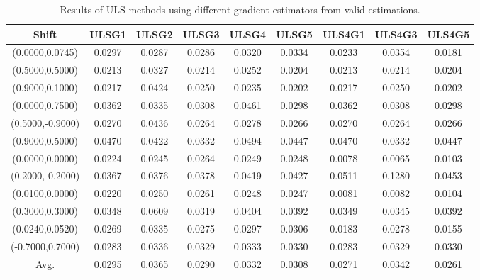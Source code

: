 \begin{table}[ht!]
\centering
\begin{tabular}{c|c|c|c|c|c|c|c|c}
Shift & \scriptsize{ULSG1} & \scriptsize{ULSG2} & \scriptsize{ULSG3} & \scriptsize{ULSG4} & \scriptsize{ULSG5} & \scriptsize{ULS4G1} & \scriptsize{ULS4G3} & \scriptsize{ULS4G5}\\ \hline 
(0.0000,0.0745) & 0.0297 & 0.0287 & 0.0286 & 0.0320 & 0.0334 & 0.0233 & 0.0354 & 0.0181 \\ \hline
(0.5000,0.5000) & 0.0213 & 0.0327 & 0.0214 & 0.0252 & 0.0204 & 0.0213 & 0.0214 & 0.0204 \\ \hline
(0.9000,0.1000) & 0.0217 & 0.0424 & 0.0250 & 0.0235 & 0.0202 & 0.0217 & 0.0250 & 0.0202 \\ \hline
(0.0000,0.7500) & 0.0362 & 0.0335 & 0.0308 & 0.0461 & 0.0298 & 0.0362 & 0.0308 & 0.0298 \\ \hline
(0.5000,-0.9000) & 0.0270 & 0.0436 & 0.0264 & 0.0278 & 0.0266 & 0.0270 & 0.0264 & 0.0266 \\ \hline
(0.9000,0.5000) & 0.0470 & 0.0422 & 0.0332 & 0.0494 & 0.0447 & 0.0470 & 0.0332 & 0.0447 \\ \hline
(0.0000,0.0000) & 0.0224 & 0.0245 & 0.0264 & 0.0249 & 0.0248 & 0.0078 & 0.0065 & 0.0103 \\ \hline
(0.2000,-0.2000) & 0.0367 & 0.0376 & 0.0378 & 0.0419 & 0.0427 & 0.0511 & 0.1280 & 0.0453 \\ \hline
(0.0100,0.0000) & 0.0220 & 0.0250 & 0.0261 & 0.0248 & 0.0247 & 0.0081 & 0.0082 & 0.0104 \\ \hline
(0.3000,0.3000) & 0.0348 & 0.0609 & 0.0319 & 0.0404 & 0.0392 & 0.0349 & 0.0345 & 0.0392 \\ \hline
(0.0240,0.0520) & 0.0269 & 0.0335 & 0.0275 & 0.0297 & 0.0306 & 0.0183 & 0.0278 & 0.0155 \\ \hline
(-0.7000,0.7000) & 0.0283 & 0.0336 & 0.0329 & 0.0333 & 0.0330 & 0.0283 & 0.0329 & 0.0330 \\ \hline
Avg.  & 0.0295 & 0.0365 & 0.0290 & 0.0332 & 0.0308 & 0.0271 & 0.0342 & 0.0261 \\ \hline
\end{tabular}
\caption{Results of ULS methods using different gradient estimators from valid estimations.}
\label{tab:ULSperShiftValid}
\end{table}


